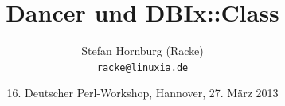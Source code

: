\usepackage[utf8]{inputenc}
\usepackage[T1]{fontenc}
\usepackage{mathptmx}
\usepackage[scaled=.90]{helvet}
\usepackage{courier}
\usepackage{caption}
\captionsetup{labelformat=empty,labelsep=none}
\usepackage{verbatim}
\usepackage{hyperref}
\usepackage{listings}
\usepackage{ulem}
\lstset{language=Perl,basicstyle=\normalsize,tabsize=3,showstringspaces=false}

\title{Dancer und DBIx::Class}
\author[racke]{Stefan Hornburg (Racke)\\ \texttt{racke@linuxia.de}}
\date{16. Deutscher Perl-Workshop, Hannover, 27. März 2013}


\maketitle{}

\begin{frame}
  \titlepage
\end{frame}

\tableofcontents









